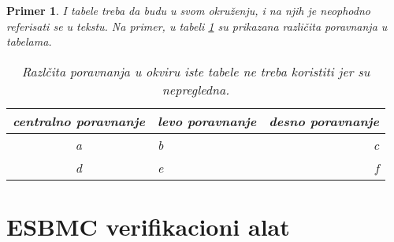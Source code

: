 \documentclass[a4paper]{article}
\newtheorem{primer}{Primer}[section]
\begin{document}
	\begin{primer} I tabele treba da budu u svom okruženju, i na njih je neophodno referisati se u tekstu. Na primer, u tabeli \ref{tab:tabela1} su prikazana različita poravnanja u tabelama.

	\begin{table}[h!]
	\begin{center}
	\caption{Razlčita poravnanja u okviru iste tabele ne treba koristiti jer su nepregledna.}
	\begin{tabular}{|c|l|r|} \hline
	centralno poravnanje& levo poravnanje& desno poravnanje\\ \hline
	a &b&c\\ \hline
	d &e&f\\ \hline
	\end{tabular}
	\label{tab:tabela1}
	\end{center}
	\end{table}

	\end{primer}





	\section{ESBMC verifikacioni alat}
	\label{sec:ESBMC}
\end{document}
